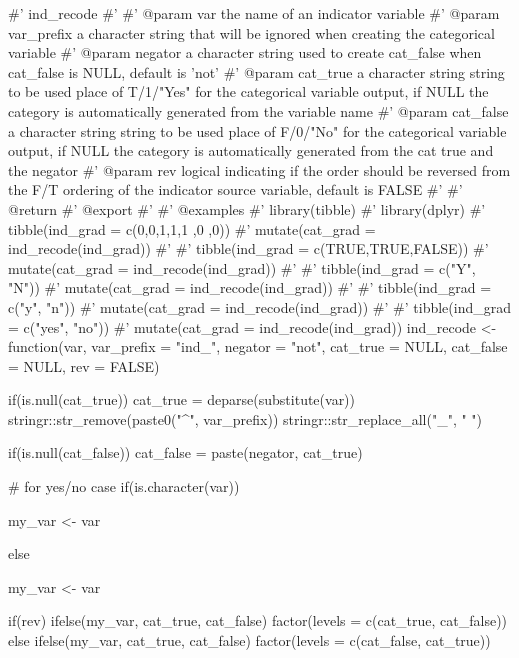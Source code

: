 \begin{Schunk}
\begin{Sinput}
#' ind_recode
#'
#' @param var the name of an indicator variable
#' @param var_prefix a character string that will be ignored when creating the categorical variable
#' @param negator a character string used to create cat_false when cat_false is NULL, default is 'not'
#' @param cat_true a character string string to be used place of  T/1/"Yes" for the categorical variable output, if NULL the category is automatically generated from the variable name
#' @param cat_false a character string string to be used place of  F/0/"No" for the categorical variable output, if NULL the category is automatically generated from the cat true and the negator
#' @param rev logical indicating if the order should be reversed from the F/T ordering of the indicator source variable, default is FALSE
#'
#' @return
#' @export
#'
#' @examples
#' library(tibble)
#' library(dplyr)
#' tibble(ind_grad = c(0,0,1,1,1 ,0 ,0)) %
#'   mutate(cat_grad  = ind_recode(ind_grad))
#'
#' tibble(ind_grad = c(TRUE,TRUE,FALSE)) %
#'   mutate(cat_grad  = ind_recode(ind_grad))
#'
#' tibble(ind_grad = c("Y", "N")) %
#'   mutate(cat_grad  = ind_recode(ind_grad))
#'
#' tibble(ind_grad = c("y", "n")) %
#'   mutate(cat_grad  = ind_recode(ind_grad))
#'
#' tibble(ind_grad = c("yes", "no")) %
#'   mutate(cat_grad  = ind_recode(ind_grad))
ind_recode <- function(var, var_prefix = "ind_", negator = "not",
                       cat_true = NULL, cat_false = NULL, rev = FALSE){

  if(is.null(cat_true)){
    cat_true = deparse(substitute(var)) %
      stringr::str_remove(paste0("^", var_prefix)) %
      stringr::str_replace_all("_", " ")
  }

  if(is.null(cat_false)){
    cat_false = paste(negator, cat_true)
  }

  # for yes/no case
  if(is.character({{var}})){

    my_var <- {{var}} %

  }else{

    my_var <- {{var}}
  }

  if(rev){
    ifelse(my_var, cat_true, cat_false) %
      factor(levels = c(cat_true, cat_false))
  }else{
    ifelse(my_var, cat_true, cat_false) %
      factor(levels = c(cat_false, cat_true))
  }


}
\end{Sinput}
\end{Schunk}



\address{%
Evangeline Reynolds\\
Affiliation\\%
line 1\\ line 2\\
%
\url{https://journal.r-project.org}\\%
\textit{ORCiD: \href{https://orcid.org/0000-0002-9079-593X}{0000-0002-9079-593X}}\\%
\href{mailto:author1@work}{\nolinkurl{author1@work}}%
}

